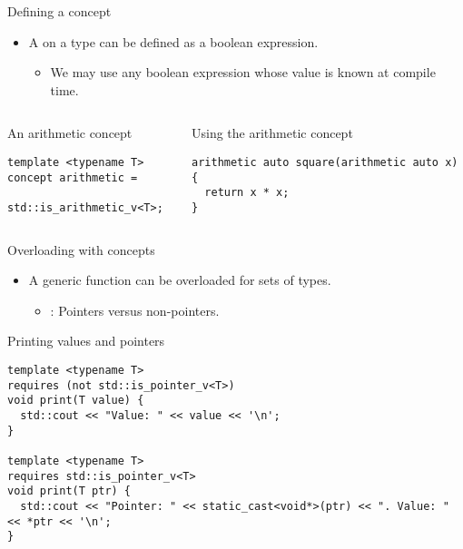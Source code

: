 \begin{frame}[t,fragile]{Defining a concept}
\begin{itemize}
  \item A  on a type can be defined as a boolean expression.
    \begin{itemize}
      \item We may use any boolean expression whose value is known at compile time.
    \end{itemize}
\end{itemize}

\begin{columns}[T]

\begin{block}{An arithmetic concept}
\begin{lstlisting}
template <typename T>
concept arithmetic = 
  std::is_arithmetic_v<T>;
\end{lstlisting}
\end{block}

\begin{block}{Using the arithmetic concept}
\begin{lstlisting}
arithmetic auto square(arithmetic auto x) {
  return x * x;
}
\end{lstlisting}
\end{block}

\end{columns}
\end{frame}

\begin{frame}[t,fragile]{Overloading with concepts}
\begin{itemize}
  \item A generic function can be overloaded for sets of types.
    \begin{itemize}
      \item {}: Pointers versus non-pointers.
    \end{itemize}
\end{itemize}

\begin{block}{Printing values and pointers}
\begin{lstlisting}
template <typename T>
requires (not std::is_pointer_v<T>)
void print(T value) {
  std::cout << "Value: " << value << '\n';
}

template <typename T>
requires std::is_pointer_v<T>
void print(T ptr) {
  std::cout << "Pointer: " << static_cast<void*>(ptr) << ". Value: " << *ptr << '\n';
}
\end{lstlisting}
\end{block}

\end{frame}


